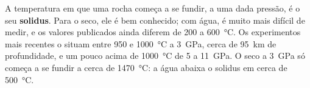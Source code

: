 A temperatura em que uma rocha começa a se fundir, a uma dada pressão, é o
seu \textbf{solidus}. Para o  seco, ele é bem conhecido; com água,
é muito mais difícil de medir, e os valores publicados ainda diferem de 200
a \qty{600}{\celsius}. Os experimentos mais recentes o situam entre 950 e
\qty{1000}{\celsius} a \qty{3}{GPa}, cerca de \qty{95}{km} de profundidade,
e um pouco acima de \qty{1000}{\celsius} de 5 a \qty{11}{GPa}. O 
seco a \qty{3}{GPa} só começa a se fundir a cerca de \qty{1470}{\celsius}:
a água abaixa o solidus em cerca de \qty{500}{\celsius}.

